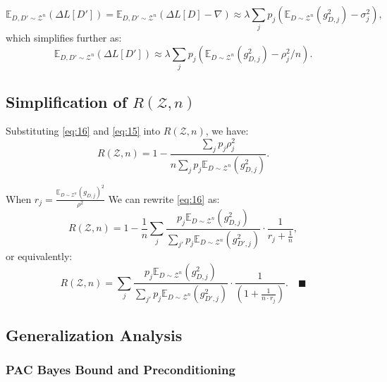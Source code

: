 \documentclass{article}
\theoremstyle{plain}
\theoremstyle{definition}
\theoremstyle{remark}
\begin{document}
\begin{equation}
\mathbb{E}_{D, D' \sim \mathcal{Z}^n}(\Delta L[D']) = \mathbb{E}_{D, D' \sim \mathcal{Z}^n}(\Delta L[D] - \nabla) 
\approx \lambda \sum_j p_j(\mathbb{E}_{D \sim \mathcal{Z}^n}(g_{D,j}^2) - \sigma_j^2),
\end{equation}
which simplifies further as:
\begin{equation}
\mathbb{E}_{D, D' \sim \mathcal{Z}^n}(\Delta L[D']) 
\approx \lambda \sum_j p_j(\mathbb{E}_{D \sim \mathcal{Z}^n}(g_{D,j}^2) - \rho_j^2 / n).
\label{eq:16}
\end{equation}

\subsection*{Simplification of \(R(\mathcal{Z}, n)\)}

Substituting \cref{eq:16} and \cref{eq:15} into \(R(\mathcal{Z}, n)\), we have:
\begin{equation}
R(\mathcal{Z}, n) = 1 - \frac{\sum_jp_j \rho_j^2}{n \sum_j p_j\mathbb{E}_{D \sim \mathcal{Z}^n}(g_{D,j}^2)}.
\label{eq:19}
\end{equation}


When $r_j = \frac{ \mathbb{E}_{D \sim \mathcal{Z}^n}(g_{D,j})^2 }{\rho^2}$ We can rewrite \cref{eq:16} as:
\begin{equation}
R(\mathcal{Z}, n) = 1 -  \frac{1}{n}\sum_j \frac{p_j\mathbb{E}_{D \sim \mathcal{Z}^n}(g_{D,j}^2)}{\sum_{j'} p_j\mathbb{E}_{D \sim \mathcal{Z}^n}(g_{D',j}^2)} \cdot \frac{1}{ r_j + \frac{1}{n}},
\end{equation}
or equivalently:
\begin{equation}
R(\mathcal{Z}, n) =  \sum_j \frac{p_j\mathbb{E}_{D \sim \mathcal{Z}^n}(g_{D,j}^2)}{\sum_{j'} p_j\mathbb{E}_{D \sim \mathcal{Z}^n}(g_{D',j}^2)} \cdot \frac{1}{\left(1 + \frac{1}{n\cdot r_j}\right)}.\quad\blacksquare
\end{equation}

\subsection{Generalization Analysis}
\subsubsection{PAC Bayes Bound and Preconditioning}
\label{ap: Proof of pacbayes}
\end{document}
